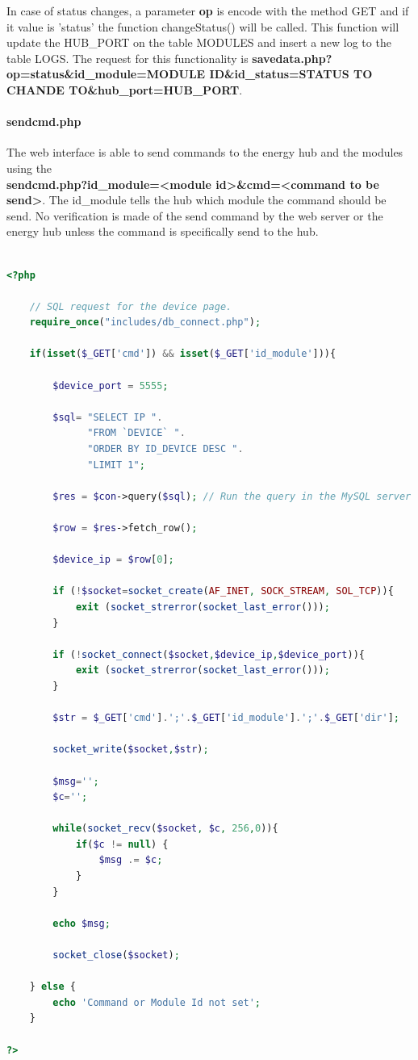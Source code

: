 In case of status changes, a parameter \textbf{op} is encode with the method GET and if it value is 'status' the function changeStatus() will be called. This function will update the HUB\_PORT on the table MODULES and insert a new log to the table LOGS. The request for this functionality is  \textbf{savedata.php?op=status\&id\_module=MODULE ID\&id\_status=STATUS TO CHANDE TO\&hub\_port=HUB\_PORT}.

\paragraph{sendcmd.php}

The web interface is able to send commands to the energy hub and the modules using the\\ \textbf{sendcmd.php?id\_module=\textless module id\textgreater\&cmd=\textless command to be send\textgreater }. The id\_module tells the hub which module the command should be send.
No verification is made of the send command by the web server or the energy hub unless the command is specifically send to the hub.

\begin{lstlisting}[language=php]

<?php
	
	// SQL request for the device page.
	require_once("includes/db_connect.php");
	
	if(isset($_GET['cmd']) && isset($_GET['id_module'])){
		
		$device_port = 5555;
			
		$sql= "SELECT IP ". 
			  "FROM `DEVICE` ". 
			  "ORDER BY ID_DEVICE DESC ".
			  "LIMIT 1";
		
		$res = $con->query($sql); // Run the query in the MySQL server
		
		$row = $res->fetch_row();
		
		$device_ip = $row[0];
		
		if (!$socket=socket_create(AF_INET, SOCK_STREAM, SOL_TCP)){
			exit (socket_strerror(socket_last_error()));
		}
	
		if (!socket_connect($socket,$device_ip,$device_port)){
			exit (socket_strerror(socket_last_error()));
		}
	
		$str = $_GET['cmd'].';'.$_GET['id_module'].';'.$_GET['dir'];
		
		socket_write($socket,$str);
	
		$msg='';
		$c='';
    	
		while(socket_recv($socket, $c, 256,0)){
  			if($c != null) {
   				$msg .= $c;
			}
		}
		
		echo $msg;
        
		socket_close($socket);
		
	} else {
		echo 'Command or Module Id not set';
	}

?>
\end{lstlisting}

